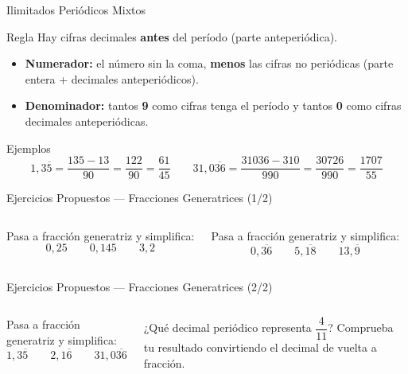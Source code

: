 \documentclass[aspectratio=169]{beamer}
\begin{document}
\begin{frame}{Ilimitados Periódicos Mixtos}
  \begin{block}{Regla}
    Hay cifras decimales \textbf{antes} del período (parte
    anteperiódica).
    \begin{itemize}
      \item \textbf{Numerador:} el número sin la coma, \textbf{menos}
            las cifras no periódicas (parte entera + decimales
            anteperiódicos).
      \item \textbf{Denominador:} tantos \textbf{9} como cifras tenga
            el período y tantos \textbf{0} como cifras decimales
            anteperiódicas.
    \end{itemize}
  \end{block}
  \vspace{4pt}
  \begin{exampleblock}{Ejemplos}
    \[
      1{,}3\overline{5} = \frac{135 - 13}{90} = \frac{122}{90}
        = \frac{61}{45}
      \qquad
      31{,}0\overline{36} = \frac{31036 - 310}{990}
        = \frac{30726}{990} = \frac{1707}{55}
    \]
  \end{exampleblock}
\end{frame}

\begin{frame}{Ejercicios Propuestos — Fracciones Generatrices \textnormal{(1/2)}}
  \begin{columns}[T]
    \begin{mwejercicio}
      Pasa a fracción generatriz y simplifica:
      \[
        0{,}25 \qquad 0{,}145 \qquad 3{,}2
      \]
    \end{mwejercicio}
    \begin{mwejercicio}
      Pasa a fracción generatriz y simplifica:
      \[
        0{,}\overline{36} \qquad 5{,}\overline{18}
        \qquad 13{,}\overline{9}
      \]
    \end{mwejercicio}
  \end{columns}
\end{frame}

\begin{frame}{Ejercicios Propuestos — Fracciones Generatrices \textnormal{(2/2)}}
  \begin{columns}[T]
    \begin{mwejercicio}
      Pasa a fracción generatriz y simplifica:
      \[
        1{,}3\overline{5} \qquad 2{,}1\overline{6}
        \qquad 31{,}0\overline{36}
      \]
    \end{mwejercicio}
    \begin{mwejercicio}
      ¿Qué decimal periódico representa $\dfrac{4}{11}$?
      Comprueba tu resultado convirtiendo el decimal de vuelta a
      fracción.
    \end{mwejercicio}
  \end{columns}
\end{frame}
\end{document}
